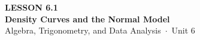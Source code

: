 \documentclass[aspectratio=169, 11pt]{beamer}
\begin{document}
{
\begin{frame}[plain]
  \vspace{2.8cm}\hspace{0.55cm}%
  \begin{minipage}{0.9\textwidth}
    {\color{goldacc}\bfseries\small LESSON 6.1}\\[0.5cm]
    {\color{white}\bfseries\LARGE Density Curves and the Normal Model}\\[1.2cm]
    {\color{mistmid}\small Algebra, Trigonometry, and Data Analysis~$\cdot$~Unit 6}
  \end{minipage}
\end{frame}
}

\begin{frame}[t, plain]
\end{frame}
\end{document}
